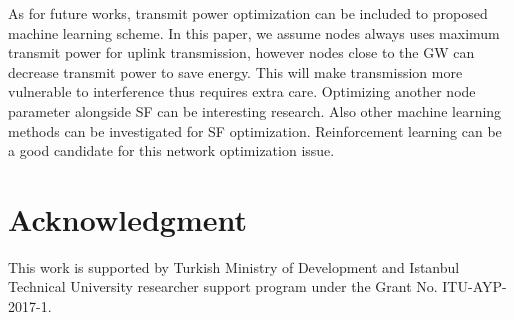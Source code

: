 \documentclass[conference]{IEEEtran}
\begin{document}
\par As for future works, transmit power optimization can be included to proposed machine learning scheme. In this paper, we assume nodes always uses maximum transmit power for uplink transmission, however nodes close to the GW can decrease transmit power to save energy. This will make transmission more vulnerable to interference thus requires extra care. Optimizing another node parameter alongside SF can be interesting research. Also other machine learning methods can be investigated for SF optimization. 
Reinforcement learning can be a good candidate for this network optimization issue.

\par \cite{7815384} \cite{7803607} \cite{7996384} \cite{8090518} \cite{s17061193} \cite{8267219} \cite{8430542} \cite{8319183} \cite{8480649} \cite{AN1200.22} \cite{Bor:2016:LLW:2988287.2989163} \cite{8406255} \cite{DBLP:journals/corr/abs-1802-10338} \cite{finnegan2018comparative}


\section*{Acknowledgment}
\par This work is supported by Turkish Ministry of Development and Istanbul Technical University researcher support program under the Grant No. ITU-AYP-2017-1.




\end{document}

